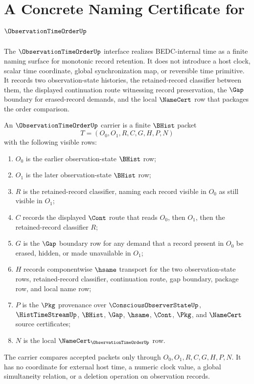 \chapter{A Concrete Naming Certificate for $\ObservationTimeOrderUp$}
\label{ch:concrete-instances-observation-time-order-namecert}

The $\ObservationTimeOrderUp$ interface realizes BEDC-internal time as a finite naming surface for monotonic record retention. It does not introduce a host clock, scalar time coordinate, global synchronization map, or reversible time primitive. It records two observation-state histories, the retained-record classifier between them, the displayed continuation route witnessing record preservation, the $\Gap$ boundary for erased-record demands, and the local $\NameCert$ row that packages the order comparison.

\begin{definition}
\label{def:observation-time-order-carrier}
An $\ObservationTimeOrderUp$ carrier is a finite $\BHist$ packet
$$
T=(O_0,O_1,R,C,G,H,P,N)
$$
with the following visible rows:
\begin{enumerate}
\item $O_0$ is the earlier observation-state $\BHist$ row;
\item $O_1$ is the later observation-state $\BHist$ row;
\item $R$ is the retained-record classifier, naming each record visible in $O_0$ as still visible in $O_1$;
\item $C$ records the displayed $\Cont$ route that reads $O_0$, then $O_1$, then the retained-record classifier $R$;
\item $G$ is the $\Gap$ boundary row for any demand that a record present in $O_0$ be erased, hidden, or made unavailable in $O_1$;
\item $H$ records componentwise $\hsame$ transport for the two observation-state rows, retained-record classifier, continuation route, gap boundary, package row, and local name row;
\item $P$ is the $\Pkg$ provenance over $\ConsciousObserverStateUp$, $\HistTimeStreamUp$, $\BHist$, $\Gap$, $\hsame$, $\Cont$, $\Pkg$, and $\NameCert$ source certificates;
\item $N$ is the local $\NameCert_{\ObservationTimeOrderUp}$ row.
\end{enumerate}
The carrier compares accepted packets only through $O_0,O_1,R,C,G,H,P,N$. It has no coordinate for external host time, a numeric clock value, a global simultaneity relation, or a deletion operation on observation records.
\end{definition}

